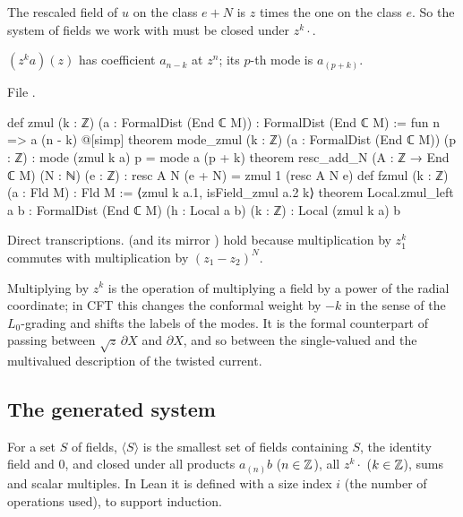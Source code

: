 The rescaled field of $u$ on the class $e+N$ is $z$ times the one on the class $e$. So the
system of fields we work with must be closed under $z^k\cdot$.

\begin{definition}\label{ch07:def:zmul}
$(z^k a)(z)$ has coefficient $a_{n-k}$ at $z^n$; its $p$-th mode is $a_{(p+k)}$.
\end{definition}

\noindent File .
\begin{leancode}
def zmul (k : ℤ) (a : FormalDist (End ℂ M)) : FormalDist (End ℂ M) := fun n => a (n - k)
@[simp] theorem mode_zmul (k : ℤ) (a : FormalDist (End ℂ M)) (p : ℤ) :
    mode (zmul k a) p = mode a (p + k)
theorem resc_add_N (A : ℤ → End ℂ M) (N : ℕ) (e : ℤ) :
    resc A N (e + N) = zmul 1 (resc A N e)
def fzmul (k : ℤ) (a : Fld M) : Fld M := ⟨zmul k a.1, isField_zmul a.2 k⟩
theorem Local.zmul_left {a b : FormalDist (End ℂ M)} (h : Local a b) (k : ℤ) :
    Local (zmul k a) b
\end{leancode}

\begin{dictionary}
Direct transcriptions.  (and its mirror ) hold
because multiplication by $z_1^k$ commutes with multiplication by $(z_1-z_2)^N$.
\end{dictionary}

\begin{physics}
Multiplying by $z^k$ is the operation of multiplying a field by a power of the radial coordinate; in CFT this changes the conformal weight by $-k$ in the sense of the $L_0$-grading and shifts the labels of the modes. It is the formal counterpart of passing between $\sqrt z\,\partial X$ and $\partial X$, and so between the single-valued and the multivalued description of the twisted current.
\end{physics}

\subsection{The generated system}

\begin{definition}\label{ch07:def:TGen}
For a set $S$ of fields, $\langle S\rangle$ is the smallest set of fields containing $S$, the
identity field and $0$, and closed under all products $a_{(n)}b$ ($n\in{\mathbb{Z}}$), all $z^k\cdot$
($k\in{\mathbb{Z}}$), sums and scalar multiples. In Lean it is defined with a size index $i$ (the number
of operations used), to support induction.
\end{definition}

